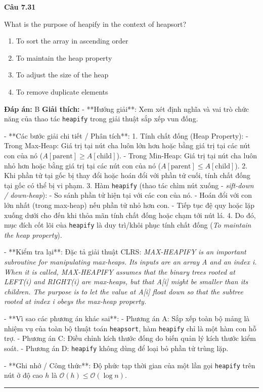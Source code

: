 \documentclass[11pt,a4paper]{article}
\newenvironment{question}[1]{%
  \par\vspace{1em}\noindent\textbf{\large Câu #1}\par\vspace{0.4em}
}{%
  \par\vspace{1em}\hrule\vspace{0.6em}
}
\newenvironment{choices}{%
  \begin{enumerate}[label=\textbf{\Alph*.},leftmargin=2.2em,itemsep=2pt,topsep=3pt]
}{%
  \end{enumerate}
}
\newcommand{\choice}{\item}
\begin{document}
\begin{question}{7.31}
What is the purpose of heapify in the context of heapsort?
\begin{choices}
\choice To sort the array in ascending order
\choice To maintain the heap property
\choice To adjust the size of the heap
\choice To remove duplicate elements
\end{choices}
\textbf{Đáp án:} B
\textbf{Giải thích:} - **Hướng giải**:
Xem xét định nghĩa và vai trò chức năng của thao tác \texttt{heapify} trong giải thuật sắp xếp vun đống.


- **Các bước giải chi tiết / Phân tích**:
1. Tính chất đống (Heap Property):
   - Trong Max-Heap: Giá trị tại nút cha luôn lớn hơn hoặc bằng giá trị tại các nút con của nó (\(A[\text{parent}] \ge A[\text{child}]\)).
   - Trong Min-Heap: Giá trị tại nút cha luôn nhỏ hơn hoặc bằng giá trị tại các nút con của nó (\(A[\text{parent}] \le A[\text{child}]\)).
2. Khi phần tử tại gốc bị thay đổi hoặc hoán đổi với phần tử cuối, tính chất đống tại gốc có thể bị vi phạm.
3. Hàm \texttt{heapify} (thao tác chìm nút xuống - \textit{sift-down / down-heap}):
   - So sánh phần tử hiện tại với các con của nó.
   - Hoán đổi với con lớn nhất (trong max-heap) nếu phần tử nhỏ hơn con.
   - Tiếp tục đệ quy hoặc lặp xuống dưới cho đến khi thỏa mãn tính chất đống hoặc chạm tới nút lá.
4. Do đó, mục đích cốt lõi của \texttt{heapify} là duy trì/khôi phục tính chất đống (\textit{To maintain the heap property}).


- **Kiểm tra lại**:
Đặc tả giải thuật CLRS: \textit{MAX-HEAPIFY is an important subroutine for manipulating max-heaps. Its inputs are an array A and an index i. When it is called, MAX-HEAPIFY assumes that the binary trees rooted at LEFT(i) and RIGHT(i) are max-heaps, but that A[i] might be smaller than its children. The purpose is to let the value at A[i] float down so that the subtree rooted at index i obeys the max-heap property.}


- **Vì sao các phương án khác sai**:
- Phương án A: Sắp xếp toàn bộ mảng là nhiệm vụ của toàn bộ thuật toán \texttt{heapsort}, hàm \texttt{heapify} chỉ là một hàm con hỗ trợ.
- Phương án C: Điều chỉnh kích thước đống do biến quản lý kích thước kiểm soát.
- Phương án D: \texttt{heapify} không dùng để loại bỏ phần tử trùng lặp.


- **Ghi nhớ / Công thức**:
Độ phức tạp thời gian của một lần gọi \texttt{heapify} trên nút ở độ cao \(h\) là \(\mathcal{O}(h) \le \mathcal{O}(\log n)\).
\end{question}
\end{document}
